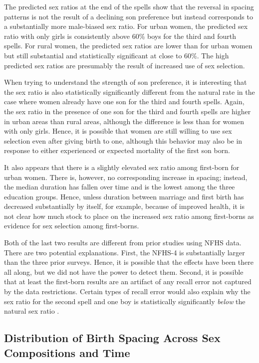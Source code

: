 \documentclass[12pt,letterpaper]{article}
\begin{document}
The predicted sex ratios at the end of the spells show that
the reversal in spacing patterns is not the result of a declining son
preference but instead corresponds to a substantially more male-biased 
sex ratio.
For urban women, the predicted sex ratio with only girls 
is consistently above 60\% boys for the third and fourth spells.
For rural women, the predicted sex ratios are lower than for urban
women but still substantial and statistically significant at close 
to 60\%.
The high predicted sex ratios are presumably the result of increased 
use of sex selection.

When trying to understand the strength of son preference, it is interesting
that the sex ratio is also statistically significantly different
from the natural rate in the case where women already have one
son for the third and fourth spells.
Again, the sex ratio in the presence of one son for the third and
fourth spells are higher in urban areas than rural areas, although
the difference is less than for women with only girls.
Hence, it is possible that women are still willing to use sex selection
even after giving birth to one, although this behavior may also 
be in response to either experienced
or expected mortality of the first son born.

It also appears that there is a slightly elevated sex ratio among 
first-born for urban women. 
There is, however, no corresponding increase in spacing; instead,
the median duration has fallen over time and is the lowest among
the three education groups.
Hence, unless duration between marriage and first birth has decreased 
substantially by itself, for example, because of improved health, it
is not clear how much stock to place on the increased sex ratio
among first-borns as evidence for sex selection among first-borns.

Both of the last two results are different from prior studies using NFHS data.
There are two potential explanations.
First, the NFHS-4 is substantially larger than the three prior surveys.
Hence, it is possible that the effects have been there all along, but 
we did not have the power to detect them.
Second, it is possible that at least the first-born results are an
artifact of any recall error not captured by the data restrictions.
Certain types of recall error would also explain why the sex ratio for
the second spell and one boy is statistically significantly \emph{below} 
the natural sex ratio \citep{Portner2018b}.


\subsection{Distribution of Birth Spacing Across Sex Compositions and Time}
\end{document}
